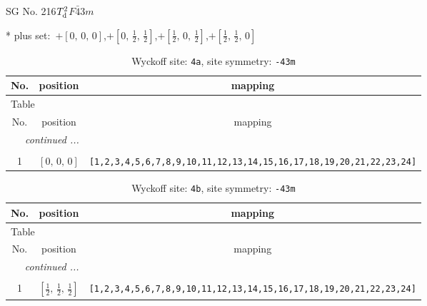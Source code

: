 \documentclass[fleqn,8pt]{jsarticle}
\begin{document}
\setcounter{MaxMatrixCols}{32}

\renewcommand{\tablename}{Table~}
\renewcommand{\figurename}{Figure~}
\begin{center}
\LARGE
SG No. 216\quad$T_{\rm d}^{2}$\quad$F\bar{4}3m$\quad[ cubic ]
\end{center}
* plus set:\,\,\,$+\left[ 0,\, 0,\, 0 \right]$,\quad $+\left[ 0,\, \frac{1}{2},\, \frac{1}{2} \right]$,\quad $+\left[ \frac{1}{2},\, 0,\, \frac{1}{2} \right]$,\quad $+\left[ \frac{1}{2},\, \frac{1}{2},\, 0 \right]$
\renewcommand{\arraystretch}{1.2}
\begin{longtable}{ccc}
\caption{Wyckoff site: {\tt 4a}, site symmetry: {\tt -43m}}
 \\
 \hline \hline
No. & position & mapping \\ \hline \endfirsthead

\multicolumn{2}{l}{\tablename\ \thetable{}} \\
 \hline \hline
No. & position & mapping \\ \hline \endhead

 \hline \hline
\multicolumn{2}{r}{\footnotesize\it continued ...} \\ \endfoot

 \hline \hline
\multicolumn{2}{r}{} \\ \endlastfoot

1 & $\left[ 0,\, 0,\, 0 \right]$ & {\tt [1,2,3,4,5,6,7,8,9,10,11,12,13,14,15,16,17,18,19,20,21,22,23,24]} \\
\end{longtable}
\renewcommand{\arraystretch}{1.2}
\begin{longtable}{ccc}
\caption{Wyckoff site: {\tt 4b}, site symmetry: {\tt -43m}}
 \\
 \hline \hline
No. & position & mapping \\ \hline \endfirsthead

\multicolumn{2}{l}{\tablename\ \thetable{}} \\
 \hline \hline
No. & position & mapping \\ \hline \endhead

 \hline \hline
\multicolumn{2}{r}{\footnotesize\it continued ...} \\ \endfoot

 \hline \hline
\multicolumn{2}{r}{} \\ \endlastfoot

1 & $\left[ \frac{1}{2},\, \frac{1}{2},\, \frac{1}{2} \right]$ & {\tt [1,2,3,4,5,6,7,8,9,10,11,12,13,14,15,16,17,18,19,20,21,22,23,24]} \\
\end{longtable}
\end{document}
